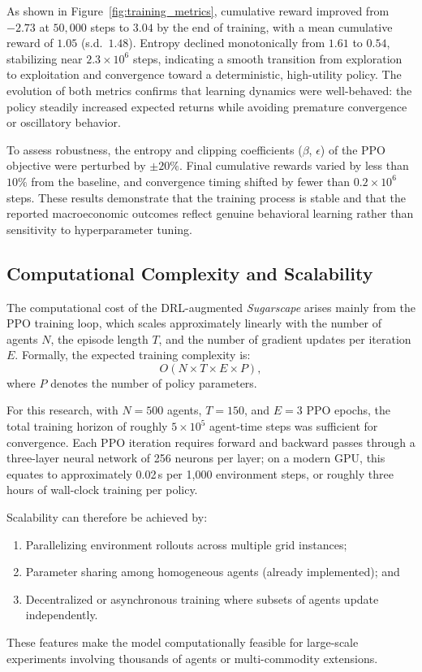 \documentclass[pdflatex,sn-mathphys-num]{sn-jnl}%
\theoremstyle{thmstyleone}%
\theoremstyle{thmstyletwo}%
\theoremstyle{thmstylethree}%
\begin{document}
As shown in Figure~\ref{fig:training_metrics}, cumulative reward improved from $-2.73$ at $50{,}000$ steps to $3.04$ by the end of training, with a mean cumulative reward of $1.05$ (s.d.\ $1.48$).  
Entropy declined monotonically from $1.61$ to $0.54$, stabilizing near $2.3\times10^{6}$ steps, indicating a smooth transition from exploration to exploitation and convergence toward a deterministic, high-utility policy.  
The evolution of both metrics confirms that learning dynamics were well-behaved: the policy steadily increased expected returns while avoiding premature convergence or oscillatory behavior.

To assess robustness, the entropy and clipping coefficients ($\beta$, $\epsilon$) of the PPO objective were perturbed by $\pm 20\%$.  
Final cumulative rewards varied by less than $10\%$ from the baseline, and convergence timing shifted by fewer than $0.2\times10^{6}$ steps.  
These results demonstrate that the training process is stable and that the reported macroeconomic outcomes reflect genuine behavioral learning rather than sensitivity to hyperparameter tuning.

\subsection{Computational Complexity and Scalability}
The computational cost of the DRL-augmented \textit{Sugarscape} arises mainly from the PPO training loop, which scales approximately linearly with the number of agents \(N\), the episode length \(T\), and the number of gradient updates per iteration \(E\).  
Formally, the expected training complexity is:
\[
O(N\times T\times E\times P),
\]
where \(P\) denotes the number of policy parameters.

For this research, with \(N=500\) agents, \(T=150\), and \(E=3\) PPO epochs, the total training horizon of roughly \(5\times10^{5}\) agent-time steps was sufficient for convergence.  
Each PPO iteration requires forward and backward passes through a three-layer neural network of 256 neurons per layer; on a modern GPU, this equates to approximately 0.02\,s per 1{,}000 environment steps, or roughly three hours of wall-clock training per policy.

Scalability can therefore be achieved by:
\begin{enumerate}
    \item Parallelizing environment rollouts across multiple grid instances;
    \item Parameter sharing among homogeneous agents (already implemented); and
    \item Decentralized or asynchronous training where subsets of agents update independently.
\end{enumerate}
These features make the model computationally feasible for large-scale experiments involving thousands of agents or multi-commodity extensions.
\end{document}
